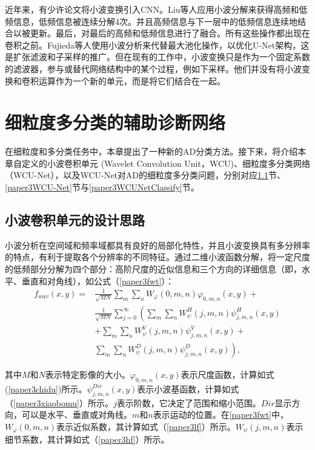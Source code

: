 近年来，有少许论文将小波变换引入CNN\cite{liu2019multi,fujieda2018wavelet,salyers2018continuous}。Liu等人\cite{liu2019multi}应用小波分解来获得高频和低频信息，低频信息被连续分解4次。并且高频信息与下一层中的低频信息连续地结合以被更新。最后，对最后的高频和低频信息进行了融合。所有这些操作都出现在卷积之前。Fujieda等人\cite{fujieda2018wavelet}使用小波分析来代替最大池化操作，以优化U-Net架构，这是扩张滤波和子采样的推广。但在现有的工作中，小波变换只是作为一个固定系数的滤波器，参与或替代网络结构中的某个过程，例如下采样。他们并没有将小波变换和卷积运算作为一个新的单元，而是将它们结合在一起。


\section{细粒度多分类的辅助诊断网络}\label{chapter4:WCU-net}
在细粒度和多分类任务中，本章提出了一种新的AD分类方法。接下来，将介绍本章自定义的小波卷积单元 (Wavelet Convolution Unit，WCU)、细粒度多分类网络（WCU-Net），以及WCU-Net对AD的细粒度多分类问题，分别对应\ref{paper3WCU}节、\ref{paper3WCU-Net}节与\ref{paper3WCUNetClassify}节。

\subsection{小波卷积单元的设计思路}\label{paper3WCU}
小波分析在空间域和频率域都具有良好的局部化特性，并且小波变换具有多分辨率的特点，有利于提取各个分辨率的不同特征。通过二维小波函数分解，将一定尺度的低频部分分解为四个部分：高阶尺度的近似信息和三个方向的详细信息（即，水平、垂直和对角线），如公式（\ref{paper3fwt}）：
\begin{equation}\label{paper3fwt}
\begin{aligned}
f_{wav}(x, y)=& \frac{1}{\sqrt{M N}} \sum_{m} \sum_{n} W_{\varphi}(0, m, n) \varphi_{0, m, n}(x, y)+\\
& \frac{1}{\sqrt{M N}} \sum_{j=0}^{\infty}\left(\sum_{m} \sum_{n} W_{\psi}^{H}(j, m, n) \psi_{j, m, n}^{H}(x, y)\right.\\
& +\sum_{m} \sum_{n} W_{\psi}^{V}(j, m, n) \psi_{j, m, n}^{V}(x, y)+\\
&\left.\sum_{m} \sum_{n} W_{\psi}^{D}(j, m, n) \psi_{j, m, n}^{D}(x, y)\right),
\end{aligned}
\end{equation}

其中$M$和$N$表示特定影像的大小。$\varphi_{0, m, n}(x, y)$表示尺度函数，计算如式(\ref{paper3chidu})所示。$\psi_{j, m, n}^{Dir}(x, y)$表示小波基函数，计算如式（\ref{paper3xiaobomu}）所示。$j$表示阶数，它决定了范围和缩小范围。$Dir$显示方向，可以是水平、垂直或对角线。$m$和$n$表示运动的位置。在\ref{paper3fwt}中，$W_{\varphi}(0, m, n)$表示近似系数，其计算如式（\ref{paper3lf}）所示。$W_{\psi}\left(j, m, n\right)$表示细节系数，其计算如式（\ref{paper3hf}）所示。



